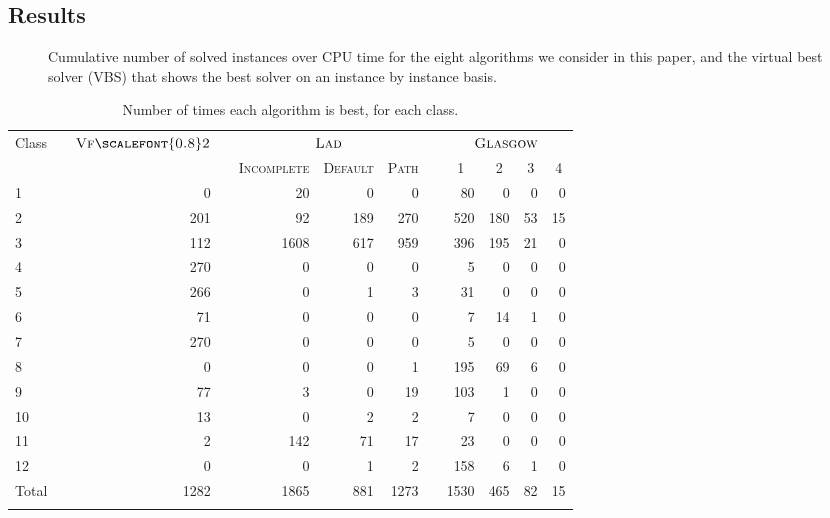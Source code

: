 \documentclass{llncs}
\newcommand{\VFtwo}{$\textsc{Vf{\scalefont{0.8}2}}$\xspace}
\newcommand{\Glasgow}{$\textsc{Glasgow}$\xspace}
\newcommand{\LAD}{$\textsc{Lad}$\xspace}
\begin{document}
\subsection{Results}\label{expComp}

\begin{figure}[p]
    \centering
    \vspace{-0.5cm}

    \caption{Cumulative number of solved instances over CPU time for the eight algorithms we
        consider in this paper, and the virtual best solver (VBS) that shows the best
    solver on an instance by instance basis.\label{expTimeGraph}}
\end{figure}

\begin{table}[p]
    \centering\setlength{\tabcolsep}{0.2em}
\begin{tabularx}{.85\textwidth}{XXrXrrrXrrrr}
\toprule
Class && \VFtwo && \multicolumn{3}{c}{\LAD} && \multicolumn{4}{c}{\Glasgow}\\
      &&&&\textsc{Incomplete}&\textsc{Default}&\textsc{Path}&&\multicolumn{1}{c}{\textsc{1}}&\multicolumn{1}{c}{\textsc{2}}&\multicolumn{1}{c}{\textsc{3}}&\multicolumn{1}{c}{\textsc{4}}\\
\midrule
1 &&        0 &&       20 &        0 &        0 &&       80 &        0 &        0 &        0 \\
2 &&      201 &&       92 &      189 &      270 &&      520 &      180 &       53 &       15 \\
3 &&      112 &&     1608 &      617 &      959 &&      396 &      195 &       21 &        0 \\
4 &&      270 &&        0 &        0 &        0 &&        5 &        0 &        0 &        0 \\
5 &&      266 &&        0 &        1 &        3 &&       31 &        0 &        0 &        0 \\
6 &&       71 &&        0 &        0 &        0 &&        7 &       14 &        1 &        0 \\
7 &&      270 &&        0 &        0 &        0 &&        5 &        0 &        0 &        0 \\
8 &&        0 &&        0 &        0 &        1 &&      195 &       69 &        6 &        0 \\
9 &&       77 &&        3 &        0 &       19 &&      103 &        1 &        0 &        0 \\
10 &&       13 &&        0 &        2 &        2 &&        7 &        0 &        0 &        0 \\
11 &&        2 &&      142 &       71 &       17 &&       23 &        0 &        0 &        0 \\
12 &&        0 &&        0 &        1 &        2 &&      158 &        6 &        1 &        0 \\
\midrule
Total && 1282 && 1865 & 881 & 1273 && 1530 & 465 & 82& 15\\
\bottomrule \\
\end{tabularx}
\caption{Number of times each algorithm is best, for each class.\label{expClass}}
\end{table}
\end{document}
